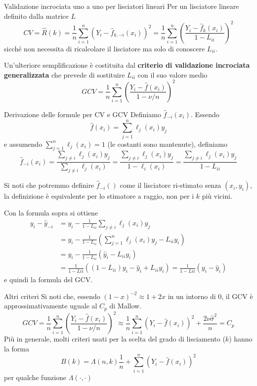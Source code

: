 \documentclass{beamer}\usepackage[]{graphicx}\usepackage[]{color}
\newcommand{\spazio}{\noindent\makebox[\linewidth]{\resizebox{0.1\linewidth}{1pt}{{$\bullet$}}}}
\begin{document}
\begin{frame}{Validazione incrociata uno  a uno per lisciatori lineari}
Per un lisciatore lineare definito dalla matrice $L$ 
\[
CV = \hat{R}(k) =\frac{1}{n} \sum_{i=1}^n (Y_i - \hat{f}_{k,-i}(x_i))^2
= \frac{1}{n} \sum_{i=1}^n\left(\frac{Y_i-\hat{f}_k(x_i)}{1-L_{ii}}\right)^2
\]
sicch\'e non necessita di ricalcolare il lisciatore ma solo di conoscere  $L_{ii}$.

\spazio

Un'ulteriore semplificazione \`e costituita dal {\bf criterio di validazione incrociata generalizzata} che prevede di sostituire $L_{ii}$ con il suo valore medio
\[ 
GCV = \frac{1}{n} \sum_{i=1}^n\left(\frac{Y_i-\hat{f}(x_i)}{1-\nu/n}\right)^2
\]
\end{frame}

\begin{frame}[allowframebreaks=0.95]{Derivazione delle formule per CV e GCV}
Definiamo $\hat{f}_{-i}(x_i)$. Essendo
\[
\hat{f}(x_i) = \sum_{j=1}^n \ell_j(x_i) y_j
\]
e assumendo $\sum_{j=1}^n \ell_j(x_i)=1$ (le costanti sono mantenute), definiamo
\[
\hat{f}_{-i}(x_i) = \frac{\sum_{j\neq i} \ell_j(x_i) y_j}{\sum_{j\neq i} \ell_j(x_i) } = \frac{\sum_{j\neq i} \ell_j(x_i) y_j}{1- \ell_i(x_i) }= \frac{\sum_{j\neq i} \ell_j(x_i) y_j}{1- L_{ii} }
\]

\spazio

Si noti che potremmo definire $\hat{f}_{-i}()$ come il lisciatore ri-stimato senza  $(x_i,y_i)$, la definizione \`e equivalente per lo stimatore a raggio, non per i $k$ pi\`u vicini.

\break

Con la formula sopra si ottiene
\begin{align*}
y_i-\hat{y}_{-i} 
&= y_i - \frac{1}{1-L_{ii}} \sum_{j\neq i} \ell_j(x_i) y_j \\
&= y_i - \frac{1}{1-L_{ii}} \left(\sum_{j=1}^n \ell_j(x_i) y_j - L_{ii}y_i\right) \\
&= y_i - \frac{1}{1-L_{ii}} \left(\hat{y}_i - L_{ii}y_i\right) \\
&= \frac{1}{1-L{ii}} \left((1-L_{ii})y_i - \hat{y}_i + L_{ii}y_i\right) = \frac{1}{1-L{ii}}(y_i-\hat{y}_i) 
\end{align*}
e quindi la formula del GCV.


\end{frame}


\begin{frame}{Altri criteri}
Si noti che, essendo $(1-x)^{-2}\approx 1+2x$ in un intorno di $0$, il GCV \`e approssimativamente uguale al $C_p$ di Mallow.
\[ 
GCV = \frac{1}{n} \sum_{i=1}^n\left(\frac{Y_i-\hat{f}(x_i)}{1-\nu/n}\right)^2
\approx \frac{1}{n} \sum_{i=1}^n\left(Y_i-\hat{f}(x_i)\right)^2 + \frac{2\nu\hat{\sigma}^2}{n} = C_p
\]
Pi\`u in generale, molti criteri usati per la scelta del grado di lisciamento ($k$) hanno la forma
\[
B(k) = \Lambda(n,k)\frac{1}{n} + \sum_{i=1}^n\left(Y_i-\hat{f}(x_i)\right)^2 
\]
per qualche funzione $\Lambda(\cdot,\cdot)$
\end{frame}
\end{document}
